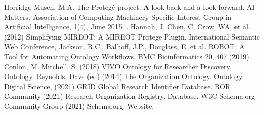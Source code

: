 \documentclass[letterpaper,10pt,english]{sphinxmanual}
\begin{document}
\begin{sphinxthebibliography}{Horridge}
Musen, M.A. The Protégé project: A look back and a look forward. AI
Matters.
Association of Computing Machinery Specific Interest Group in Artificial Intelligence,
1(4), June 2015. .
\sphinxAtStartPar
Hannah, J, Chen, C, Crow, WA, et al. (2012) Simplifying MIREOT: A
MIREOT Protege Plugin. International Semantic Web Conference,
\sphinxAtStartPar
Jackson, R.C., Balhoff, J.P., Douglass, E. et al. ROBOT: A Tool
for Automating Ontology Workflows. BMC Bioinformatics 20, 407 (2019).
\sphinxAtStartPar
Conlon, M. Mitchell, S. (2018) VIVO Ontology for Researcher Discovery.
Ontology.
\sphinxAtStartPar
Reynolds, Dave (ed) (2014) The Organization Ontology.
Ontology.  
\sphinxAtStartPar
Digital Science, (2021) GRID Global Research Identifier Database.
\sphinxAtStartPar
ROR Community (2021) Research Organization Registry. Database.
\sphinxAtStartPar
W3C Schema.org Community Group (2021) Schema.org. Website.
\end{sphinxthebibliography}



\renewcommand{\indexname}{Index}
\printindex
\end{document}
